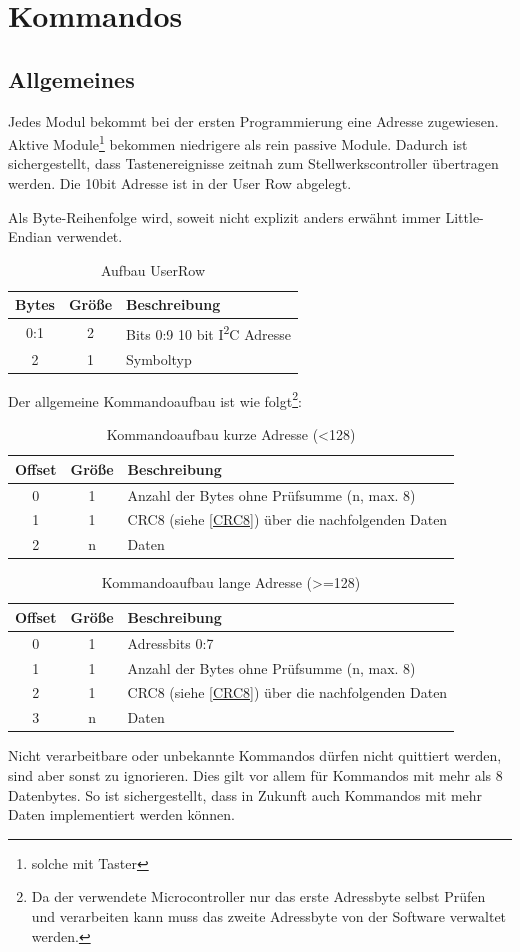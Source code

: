 \documentclass[10pt,a4paper]{article}
\begin{document}
\section{Kommandos}
\subsection{Allgemeines}
Jedes Modul bekommt bei der ersten Programmierung eine Adresse zugewiesen. Aktive Module\footnote{solche mit Taster} bekommen niedrigere als rein passive Module. Dadurch ist sichergestellt, dass Tastenereignisse zeitnah zum Stellwerkscontroller übertragen werden. Die 10bit Adresse ist in der User Row abgelegt.

Als Byte-Reihenfolge wird, soweit nicht explizit anders erwähnt immer Little-Endian verwendet.

\begin{table}[H]
\centering
\begin{tabular}{c|c|l}
\textbf{Bytes} & \textbf{Größe} & \textbf{Beschreibung} \\ \hline
0:1 & 2 & Bits 0:9 10 bit I\textsuperscript{2}C Adresse \\
2 & 1 & Symboltyp 
\end{tabular}
\caption{Aufbau UserRow}
\end{table}

Der allgemeine Kommandoaufbau ist wie folgt\footnote{Da der verwendete Microcontroller nur das erste Adressbyte selbst Prüfen und verarbeiten kann muss das zweite Adressbyte von der Software verwaltet werden.}:
\begin{table}[H]
\centering
\begin{tabular}{c|c|l}
\textbf{Offset} & \textbf{Größe} & \textbf{Beschreibung} \\ \hline
0 & 1 & Anzahl der Bytes  ohne Prüfsumme (n, max. 8)\\
1 & 1 & CRC8 (siehe \ref{CRC8}) über die nachfolgenden Daten\\
2 & n & Daten
\end{tabular}
\caption{Kommandoaufbau kurze Adresse (<128)}
\end{table}

\begin{table}[H]
\centering
\begin{tabular}{c|c|l}
\textbf{Offset} & \textbf{Größe} & \textbf{Beschreibung} \\ \hline
0 & 1 & Adressbits 0:7 \\
1 & 1 & Anzahl der Bytes  ohne Prüfsumme (n, max. 8)\\
2 & 1 & CRC8 (siehe \ref{CRC8}) über die nachfolgenden Daten\\
3 & n & Daten
\end{tabular}
\caption{Kommandoaufbau lange Adresse (>=128)}
\end{table}
Nicht verarbeitbare oder unbekannte Kommandos dürfen nicht quittiert werden, sind aber sonst zu ignorieren. Dies gilt vor allem für Kommandos mit mehr als 8 Datenbytes. So ist sichergestellt, dass in Zukunft auch Kommandos mit mehr Daten implementiert werden können.
\end{document}
